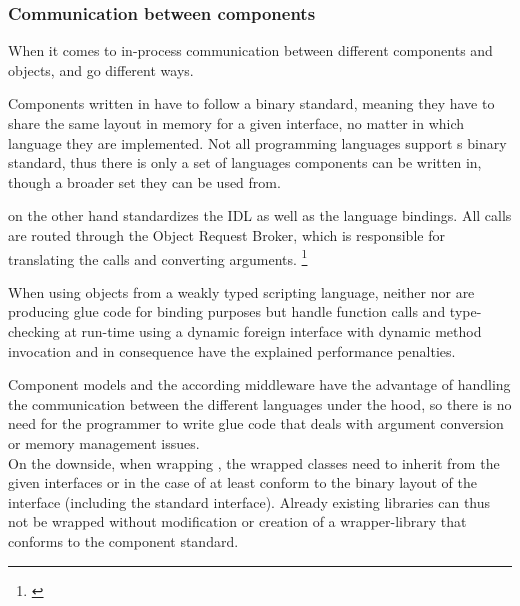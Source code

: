 \subsubsection{Communication between components}

When it comes to in-process communication between different components and objects,  and  go different ways. 

Components written in  have to follow a binary standard, meaning they have to share the same layout in memory for a given interface, no matter in which language they are implemented. Not all programming languages support s binary standard, thus there is only a set of languages  components can be written in, though a broader set they can be used from.

 on the other hand standardizes the IDL as well as the language bindings. All calls are routed through the Object Request Broker, which is responsible for translating the calls and converting arguments. \footnote{\citep[83]{ComponentTechnology}}

When using objects from a weakly typed scripting language, neither  nor  are producing glue code for binding purposes but handle function calls and type-checking at run-time using a dynamic foreign interface with dynamic method invocation and in consequence have the explained performance penalties.

Component models and the according middleware have the advantage of handling the communication between the different languages under the hood, so there is no need for the programmer to write glue code that deals with argument conversion or memory management issues.\\
On the downside, when wrapping , the wrapped classes need to inherit from the given interfaces or in the case of  at least conform to the binary layout of the interface (including the standard  interface). Already existing libraries can thus not be wrapped without modification or creation of a wrapper-library that conforms to the component standard.


